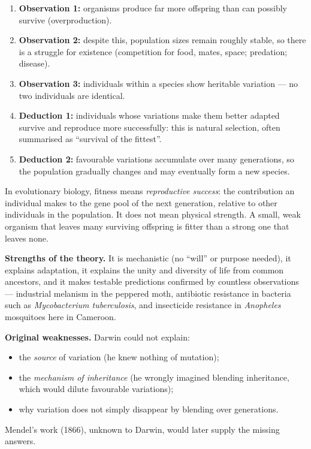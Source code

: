 \documentclass[11pt]{article}
\newcommand{\cle}[1]{{\popxbold\color{popdark}#1}}
\begin{document}
\begin{enumerate}
\item \textbf{Observation 1:} organisms produce far more offspring than can possibly survive (overproduction).
\item \textbf{Observation 2:} despite this, population sizes remain roughly stable, so there is a \cle{struggle for existence} (competition for food, mates, space; predation; disease).
\item \textbf{Observation 3:} individuals within a species show heritable \cle{variation} — no two individuals are identical.
\item \textbf{Deduction 1:} individuals whose variations make them better adapted survive and reproduce more successfully: this is \cle{natural selection}, often summarised as ``survival of the fittest''.
\item \textbf{Deduction 2:} favourable variations accumulate over many generations, so the population gradually changes and may eventually form a new species.
\end{enumerate}

\begin{definition}[Fitness]
In evolutionary biology, \cle{fitness} means \emph{reproductive success}: the contribution an individual makes to the gene pool of the next generation, relative to other individuals in the population. It does not mean physical strength. A small, weak organism that leaves many surviving offspring is fitter than a strong one that leaves none.
\end{definition}

\textbf{Strengths of the theory.} It is mechanistic (no ``will'' or purpose needed), it explains adaptation, it explains the unity and diversity of life from common ancestors, and it makes testable predictions confirmed by countless observations — industrial melanism in the peppered moth, antibiotic resistance in bacteria such as \emph{Mycobacterium tuberculosis}, and insecticide resistance in \emph{Anopheles} mosquitoes here in Cameroon.

\textbf{Original weaknesses.} Darwin could not explain:
\begin{itemize}
\item the \emph{source} of variation (he knew nothing of mutation);
\item the \emph{mechanism of inheritance} (he wrongly imagined blending inheritance, which would dilute favourable variations);
\item why variation does not simply disappear by blending over generations.
\end{itemize}
Mendel's work (1866), unknown to Darwin, would later supply the missing answers.
\end{document}
